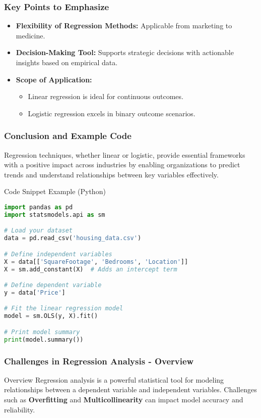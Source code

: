 \documentclass[aspectratio=169]{beamer}
\begin{document}
\begin{frame}
    \frametitle{Key Points to Emphasize}

    \begin{itemize}
        \item \textbf{Flexibility of Regression Methods:} Applicable from marketing to medicine.
        \item \textbf{Decision-Making Tool:} Supports strategic decisions with actionable insights based on empirical data.
        \item \textbf{Scope of Application:} 
        \begin{itemize}
            \item Linear regression is ideal for continuous outcomes.
            \item Logistic regression excels in binary outcome scenarios.
        \end{itemize}
    \end{itemize}
\end{frame}

\begin{frame}[fragile]
    \frametitle{Conclusion and Example Code}
    
    Regression techniques, whether linear or logistic, provide essential frameworks with a positive impact across industries by enabling organizations to predict trends and understand relationships between key variables effectively.
    
    \begin{block}{Code Snippet Example (Python)}
    \begin{lstlisting}[language=Python]
import pandas as pd
import statsmodels.api as sm

# Load your dataset
data = pd.read_csv('housing_data.csv')

# Define independent variables
X = data[['SquareFootage', 'Bedrooms', 'Location']]
X = sm.add_constant(X)  # Adds an intercept term

# Define dependent variable
y = data['Price']

# Fit the linear regression model
model = sm.OLS(y, X).fit()

# Print model summary
print(model.summary())
    \end{lstlisting}
    \end{block}
\end{frame}

\begin{frame}[fragile]
    \frametitle{Challenges in Regression Analysis - Overview}
    \begin{block}{Overview}
        Regression analysis is a powerful statistical tool for modeling relationships between a dependent variable and independent variables. 
        Challenges such as \textbf{Overfitting} and \textbf{Multicollinearity} can impact model accuracy and reliability.
    \end{block}
\end{frame}
\end{document}
